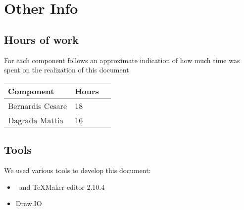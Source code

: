 \section{Other Info}
\subsection{Hours of work}
	For each component follows an approximate indication of how much time was
	spent on the realization of this document
	\begin{center}
		\begin{tabular}{ | l | l | p{5cm} |}
			\hline
			Component & Hours 					\\ \hline
			Bernardis Cesare & 18 				\\ \hline
			Dagrada Mattia & 16  				\\ \hline
			\end{tabular}
			\end{center}
			
\subsection{Tools}
	We used various tools to develop this document:
	\begin{itemize}
		\item \LaTeXe \, and TeXMaker editor 2.10.4
		\item Draw.IO
	\end{itemize}
